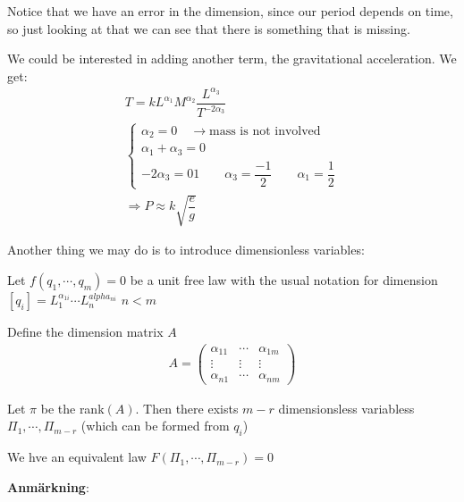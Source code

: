 \noindent Notice that we have an error in the dimension, since our period depends on time, so just looking at that we can see that there is something that is missing.
\par\bigskip
\noindent We could be interested in adding another term, the gravitational acceleration. We get:
\begin{equation*}
  \begin{gathered}
    T = kL^{\alpha_1}M^{\alpha_2}\dfrac{L^{\alpha_3}}{T^{-2\alpha_3}}\\
    \begin{cases*}
      \alpha_2 = 0\quad\rightarrow \text{mass is not involved}\\
    \alpha_1+\alpha_3 = 0\\
    -2\alpha_3 = 01\qquad \alpha_3 = \dfrac{-1}{2}\qquad \alpha_1 = \dfrac{1}{2}
    \end{cases*}\\
    \Rightarrow P\approx k\sqrt{\dfrac{e}{g}}
  \end{gathered}
\end{equation*}
\par\bigskip
\noindent Another thing we may do is to introduce dimensionless variables:
\par\bigskip
\begin{theo}[Pi:s theorem]{}
  Let $f(q_1,\cdots,q_m) = 0$ be a unit free law with the usual notation for dimension $[q_i] = L_1^{\alpha_{1i}}\cdots L_n^{alpha_{ni}}$ $n<m$
  \par\bigskip
  \noindent Define the dimension matrix $A$
  \begin{equation*}
    \begin{gathered}
      A = \begin{pmatrix}\alpha_{11}&\cdots&\alpha_{1m}\\
      \vdots&\vdots&\vdots\\
    \alpha_{n1}&\cdots&\alpha_{nm}\end{pmatrix}
    \end{gathered}
  \end{equation*}
  \par\bigskip
  \noindent Let $\pi$ be the rank$(A)$. Then there exists $m-r$ dimensionsless variabless $\Pi_1,\cdots,\Pi_{m-r}$ (which can be formed from $q_i$)
  \par\bigskip
  \noindent We hve an equivalent law $F(\Pi_1,\cdots,\Pi_{m-r}) = 0$
\end{theo}
\par\bigskip
\noindent\textbf{Anmärkning}:\par
